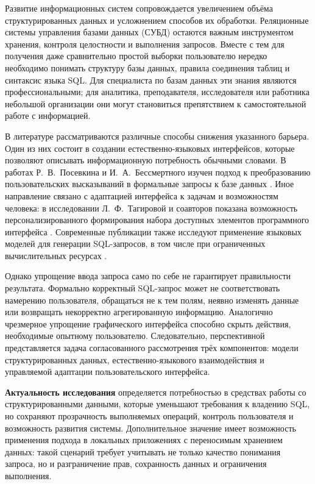 
Развитие информационных систем сопровождается увеличением объёма структурированных данных и усложнением способов их обработки. Реляционные системы управления базами данных (СУБД) остаются важным инструментом хранения, контроля целостности и выполнения запросов. Вместе с тем для получения даже сравнительно простой выборки пользователю нередко необходимо понимать структуру базы данных, правила соединения таблиц и синтаксис языка SQL. Для специалиста по базам данных эти знания являются профессиональными; для аналитика, преподавателя, исследователя или работника небольшой организации они могут становиться препятствием к самостоятельной работе с информацией.

В литературе рассматриваются различные способы снижения указанного барьера. Один из них состоит в создании естественно-языковых интерфейсов, которые позволяют описывать информационную потребность обычными словами. В работах Р.~В.~Посевкина и И.~А.~Бессмертного изучен подход к преобразованию пользовательских высказываний в формальные запросы к базе данных \cite{posevkin2016,posevkin2018}. Иное направление связано с адаптацией интерфейса к задачам и возможностям человека: в исследовании Л.~Ф.~Тагировой и соавторов показана возможность персонализированного формирования набора доступных элементов программного интерфейса \cite{tagirova2022}. Современные публикации также исследуют применение языковых моделей для генерации SQL-запросов, в том числе при ограниченных вычислительных ресурсах \cite{bosenko2025}.

Однако упрощение ввода запроса само по себе не гарантирует правильности результата. Формально корректный SQL-запрос может не соответствовать намерению пользователя, обращаться не к тем полям, неявно изменять данные или возвращать некорректно агрегированную информацию. Аналогично чрезмерное упрощение графического интерфейса способно скрыть действия, необходимые опытному пользователю. Следовательно, перспективной представляется задача согласованного рассмотрения трёх компонентов: модели структурированных данных, естественно-языкового взаимодействия и управляемой адаптации пользовательского интерфейса.

\textbf{Актуальность исследования} определяется потребностью в средствах работы со структурированными данными, которые уменьшают требования к владению SQL, но сохраняют прозрачность выполняемых операций, контроль пользователя и возможность развития системы. Дополнительное значение имеет возможность применения подхода в локальных приложениях с переносимым хранением данных: такой сценарий требует учитывать не только качество понимания запроса, но и разграничение прав, сохранность данных и ограничения выполнения.

